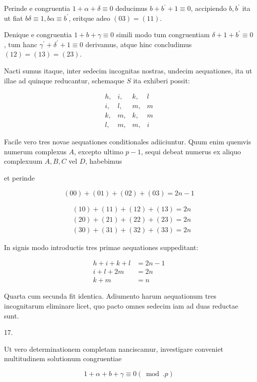 \documentclass[10pt]{article}
\begin{document}
Perinde e congruentia \(1+\alpha+\delta \equiv 0\) deducimus \(b+b^{\prime}+1 \equiv 0\), accipiendo \(b, b^{\prime}\) ita ut fiat \(b \delta \equiv 1, b \alpha \equiv b^{\prime}\), eritque adeo \((03)=(11)\).

Denique e congruentia \(1+b+\gamma \equiv 0\) simili modo tum congruentiam \(\delta+1+b^{\prime} \equiv 0\), tum hanc \(\gamma^{\prime}+\delta^{\prime}+1 \equiv 0\) derivamus, atque hinc concludimus \((12)=(13)=(23)\).

Nacti sumus itaque, inter sedecim incognitas nostras, undecim aequationes, ita ut illae ad quinque reducantur, schemaque \(S\) ita exhiberi possit:

\[
\begin{array}{llll}
h, & i, & k, & l \\
i, & l, & m, & m \\
k, & m, & k, & m \\
l, & m, & m, & i
\end{array}
\]

Facile vero tres novae aequationes conditionales adiiciuntur. Quum enim quemvis numerum complexus \(A\), excepto ultimo \(p-1\), sequi debeat numerus ex aliquo complexuum \(A, B, C\) vel \(D\), habebimus

et perinde

\[
(00)+(01)+(02)+(03)=2 n-1
\]

\[
\begin{aligned}
& (10)+(11)+(12)+(13)=2 n \\
& (20)+(21)+(22)+(23)=2 n \\
& (30)+(31)+(32)+(33)=2 n
\end{aligned}
\]

In signis modo introductis tres primae aequationes suppeditant:

\[
\begin{aligned}
h+i+k+l & =2 n-1 \\
i+l+2 m & =2 n \\
k+m & =n
\end{aligned}
\]

Quarta cum secunda fit identica. Adiumento harum aequationum tres incognitarum eliminare licet, quo pacto omnes sedecim iam ad duas reductae sunt.

17.

Ut vero determinationem completam nanciscamur, investigare conveniet multitudinem solutionum congruentiae

\[
1+\alpha+b+\gamma \equiv 0(\bmod . p)
\]
\end{document}
